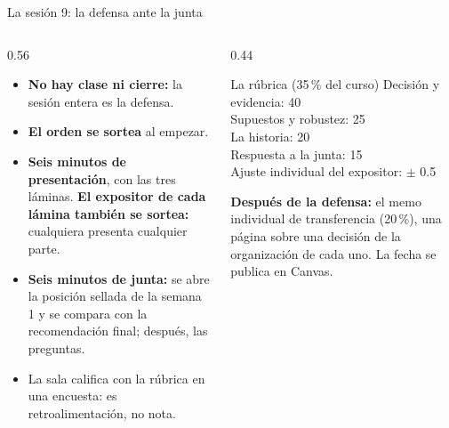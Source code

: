 \documentclass{beamer}
\begin{document}
\begin{frame}{La sesión 9: la defensa ante la junta}
\begin{columns}[T]
\begin{column}{0.56\textwidth}
\small
\begin{itemize}\itemsep4pt
  \item \textbf{No hay clase ni cierre:} la sesión entera es la defensa.
  \item \textbf{El orden se sortea} al empezar.
  \item \textbf{Seis minutos de presentación}, con las tres láminas. \textbf{El expositor de cada lámina también se sortea:} cualquiera presenta cualquier parte.
  \item \textbf{Seis minutos de junta:} se abre la posición sellada de la semana 1 y se compara con la recomendación final; después, las preguntas.
  \item La sala califica con la rúbrica en una encuesta: es retroalimentación, no nota.
\end{itemize}
\end{column}
\begin{column}{0.44\textwidth}
\begin{block}{La rúbrica (35\,\% del curso)}
\footnotesize
Decisión y evidencia: 40\\
Supuestos y robustez: 25\\
La historia: 20\\
Respuesta a la junta: 15\\
Ajuste individual del expositor: $\pm$ 0.5
\end{block}
{\footnotesize \textbf{Después de la defensa:} el memo individual de transferencia (20\,\%), una página sobre una decisión de la organización de cada uno. La fecha se publica en Canvas.\par}
\end{column}
\end{columns}
\end{frame}
\end{document}
